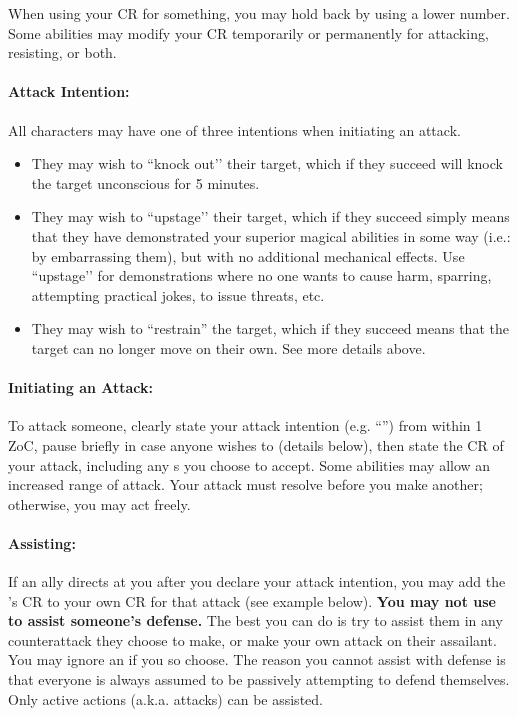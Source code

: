 \documentclass[sheet]{GL2020}
\begin{document}
When using your CR for something, you may hold back by using a lower number. Some abilities may modify your CR temporarily or permanently for attacking, resisting, or both.

\paragraph{Attack Intention:} All characters may have one of three intentions when initiating an attack. 
\begin{itemize}
	\item They may wish to ``knock out'’ their target, which if they succeed will knock the target unconscious for 5 minutes. 
	\item They may wish to ``upstage'’ their target, which if they succeed simply means that they have demonstrated your superior magical abilities in some way (i.e.: by embarrassing them), but with no additional mechanical effects. Use ``upstage'’ for demonstrations where no one wants to cause harm, sparring, attempting practical jokes, to issue threats, etc. \
	\item They may wish to ``restrain'' the target, which if they succeed means that the target can no longer move on their own. See more details above. 
\end{itemize}

\paragraph{Initiating an Attack:} To attack someone, clearly state your attack intention (e.g. ``\aKnockOut{}'') from within 1 ZoC, pause briefly in case anyone wishes to \aAssist{} (details below), then state the CR of your attack, including any \aAssist{}s you choose to accept. Some abilities may allow an increased range of attack. Your attack must resolve before you make another; otherwise, you may act freely. 

\paragraph{Assisting:} If an ally directs {\bf \aAssist{}} at you after you declare your attack intention, you may add the \aAssist{}'s CR to your own CR for that attack (see example below). \textbf{You may not use \aAssist{} to assist someone's defense.} The best you can do is try to assist them in any counterattack they choose to make, or make your own attack on their assailant. You may ignore an \aAssist{} if you so choose. The reason you cannot assist with defense is that everyone is always assumed to be passively attempting to defend themselves. Only active actions (a.k.a. attacks) can be assisted.
\end{document}
